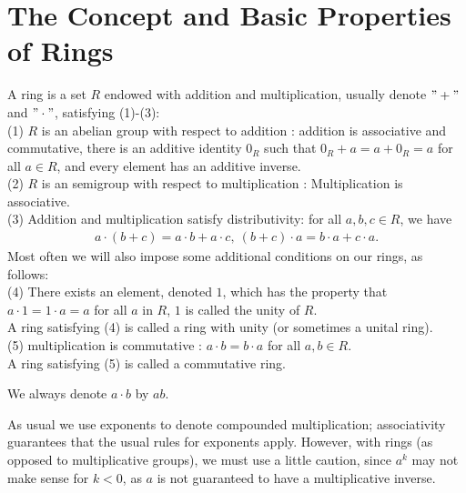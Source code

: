 \chapter{The Concept and Basic Properties of Rings}\label{chp:4_1}

\begin{definition}{}{}
    A ring is a set $R$ endowed with addition and multiplication, usually denote $"+"$ and $"\cdot"$, satisfying (1)-(3):
    \\
    (1) $R$ is an abelian group with respect to addition : addition is associative and commutative, there is an additive identity $0_R$
    such that $0_R + a=a+0_R = a$ for all $a\in R$, and every element has an additive inverse.\\
    (2) $R$ is an semigroup with respect to multiplication : Multiplication is associative.
    \\
    (3) Addition and multiplication satisfy distributivity: for all $a, b, c \in R$, we have
    \begin{align*}
        a\cdot(b+c)=a\cdot b + a\cdot c, \ (b+c)\cdot a = b\cdot a+c\cdot a.
    \end{align*}
    Most often we will also impose some additional conditions on our rings, as follows:\\

    (4) There exists an element, denoted $1$, which has the property that $a \cdot 1 = 1 \cdot a = a$ for all $a$ in
    $R$, $1$ is called the unity of $R$.\\
    A ring satisfying (4) is called a ring with unity (or sometimes a unital ring).
    \\

    (5) multiplication is commutative : $a\cdot b=b\cdot a$ for all $a,b\in R$. \\
    A ring satisfying (5) is called a commutative ring.    
\end{definition}



\begin{remark}
    We always denote $a\cdot b$ by $ab$.
\end{remark}

\begin{remark}
    As usual we use exponents to denote compounded multiplication; associativity guarantees that the
usual rules for exponents apply. However, with rings (as opposed to multiplicative groups), we must use
a little caution, since $a^k$ may not make sense for $k < 0$, as $a$ is not guaranteed to have a multiplicative
inverse.
\end{remark}

